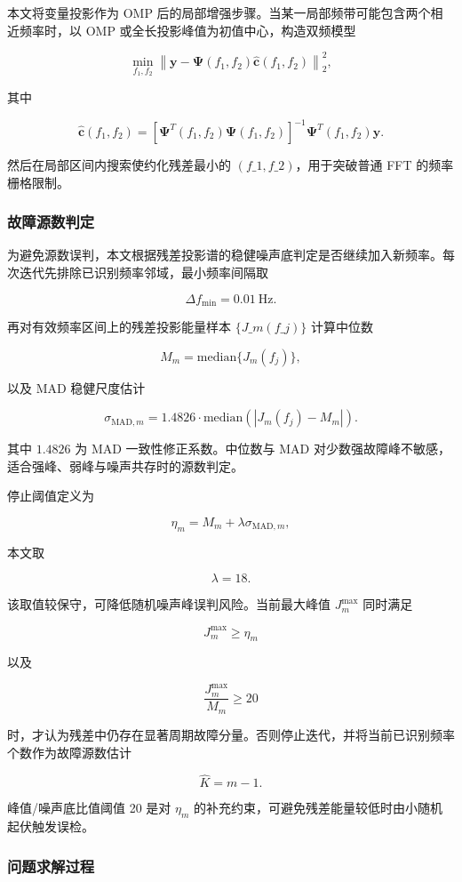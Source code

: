 \documentclass[UTF8,a4paper,12pt]{ctexart}
\numberwithin{figure}{section}
\numberwithin{table}{section}
\begin{document}
本文将变量投影作为 OMP 后的局部增强步骤。当某一局部频带可能包含两个相近频率时，以 OMP 或全长投影峰值为初值中心，构造双频模型


\[
\min_{f_1,f_2}
\left\|
\mathbf y-\boldsymbol\Psi(f_1,f_2)
\hat{\mathbf c}(f_1,f_2)
\right\|_2^2,
\]


其中


\[
\hat{\mathbf c}(f_1,f_2)
=
\left[\boldsymbol\Psi^T(f_1,f_2)\boldsymbol\Psi(f_1,f_2)\right]^{-1}
\boldsymbol\Psi^T(f_1,f_2)\mathbf y.
\]


然后在局部区间内搜索使约化残差最小的 \((f\_1,f\_2)\)，用于突破普通 FFT 的频率栅格限制。


\subsubsection{故障源数判定}


为避免源数误判，本文根据残差投影谱的稳健噪声底判定是否继续加入新频率。每次迭代先排除已识别频率邻域，最小频率间隔取


\[
\Delta f_{\min}=0.01\ \mathrm{Hz}.
\]


再对有效频率区间上的残差投影能量样本 \(\{J\_m(f\_j)\}\) 计算中位数


\[
M_m=\mathrm{median}\{J_m(f_j)\},
\]


以及 MAD 稳健尺度估计


\[
\sigma_{\mathrm{MAD},m}
=1.4826\cdot
\mathrm{median}\left(|J_m(f_j)-M_m|\right).
\]


其中 \(1.4826\) 为 MAD 一致性修正系数。中位数与 MAD 对少数强故障峰不敏感，适合强峰、弱峰与噪声共存时的源数判定。


停止阈值定义为


\[
\eta_m=M_m+\lambda\sigma_{\mathrm{MAD},m},
\]


本文取


\[
\lambda=18.
\]


该取值较保守，可降低随机噪声峰误判风险。当前最大峰值 \(J_m^{\max}\) 同时满足


\[
J_m^{\max}\ge \eta_m
\]


以及


\[
\frac{J_m^{\max}}{M_m}\ge 20
\]


时，才认为残差中仍存在显著周期故障分量。否则停止迭代，并将当前已识别频率个数作为故障源数估计


\[
\hat K=m-1.
\]


峰值/噪声底比值阈值 20 是对 \(\eta_m\) 的补充约束，可避免残差能量较低时由小随机起伏触发误检。


\subsubsection{问题求解过程}
\end{document}
